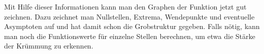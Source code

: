Mit Hilfe dieser Informationen kann man den Graphen der Funktion jetzt gut zeichnen. Dazu zeichnet man Nullstellen, Extrema, Wendepunkte und eventuelle Asymptoten auf und hat damit schon die Grobstruktur gegeben. Falls nötig, kann man noch die Funktionswerte für einzelne Stellen berechnen, um etwa die Stärke der Krümmung zu erkennen.










%
